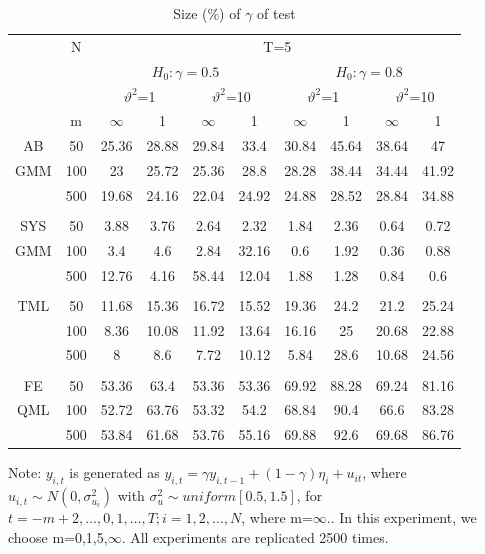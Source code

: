 \documentclass[12pt,a4paper,hyperref]{article}
\begin{document}
\begin{center}
\begin{table}[H]
\caption{Size (\%) of $\gamma$ of test} \label{table11}
\centering
\begin{tabular} {*{10}{c}}
\toprule
&N& \multicolumn{8}{c}{T=5}\\
\cmidrule(lr){3-10}
&& \multicolumn{4}{c}{$H_{0}: \gamma=0.5$} & \multicolumn{4}{c}{$H_{0}: \gamma=0.8$}\\
  \cmidrule(lr){3-6} \cmidrule(lr){7-10}
&&  \multicolumn{2}{c}{$\vartheta^{2}$=1}&\multicolumn{2}{c}{$\vartheta^{2}$=10} & \multicolumn{2}{c}{$\vartheta^{2}$=1}&\multicolumn{2}{c}{$\vartheta^{2}$=10}\\
\cmidrule(lr){3-4} \cmidrule(lr){5-6}\cmidrule(lr){7-8}\cmidrule(lr){9-10}
& m & $\infty$ &1&$\infty$ &1&$\infty$ &1&$\infty$&1\\
\cmidrule(lr){3-4} \cmidrule(lr){5-6}\cmidrule(lr){7-8}\cmidrule(lr){9-10}
AB&50 &25.36&	28.88&	29.84&	33.4	&30.84	&45.64&	38.64	&47 \\
GMM&100&23	&25.72	&25.36	&28.8	&28.28	&38.44&	34.44&	41.92\\ 
 &500& 19.68&	24.16	&22.04	&24.92&	24.88&	28.52	&28.84&	34.88\\
\midrule \\
\cmidrule(lr){3-4} \cmidrule(lr){5-6}\cmidrule(lr){7-8}\cmidrule(lr){9-10}
SYS&50 &3.88	&3.76&	2.64&	2.32	&1.84&	2.36&	0.64&	0.72\\
 GMM&100& 3.4	&4.6&	2.84	&32.16	&0.6&	1.92	&0.36&	0.88\\  
 &500 &12.76	&4.16	&58.44	&12.04&	1.88&	1.28&	0.84&	0.6\\

\midrule \\
\cmidrule(lr){3-4} \cmidrule(lr){5-6}\cmidrule(lr){7-8}\cmidrule(lr){9-10}
TML &50 	&11.68&	15.36	&16.72&15.52&	19.36	&24.2&	21.2	&25.24 \\
&100&8.36	&10.08&	11.92&	13.64	&16.16&	25	&20.68&	22.88\\
 &500 & 8&	8.6	&7.72&	10.12&	5.84&	28.6&	10.68	&24.56  \\
 \midrule \\
\cmidrule(lr){3-4} \cmidrule(lr){5-6}\cmidrule(lr){7-8}\cmidrule(lr){9-10}
FE& 50 &53.36&	63.4&53.36&	53.36&69.92&88.28&	69.24&81.16
\\
 QML&100 &52.72	&63.76&53.32&54.2&68.84	&90.4&	66.6	&83.28
 \\ 
 &500 &53.84&61.68&53.76&55.16&69.88&92.6&	69.68&	86.76
 \\  
\bottomrule
\end{tabular}
\begin{tablenotes}
      \small
      \item Note: $y_{i,t}$ is generated as $y_{i,t}=\gamma y_{i,t-1}+(1-\gamma)\eta_{i}+u_{it}$, where $u_{i,t} \sim N\left(0, \sigma^{2}_{u_{i}} \right)$ with $\sigma^{2}_{u} \sim uniform\left[0.5,1.5 \right]$, for $t=-m+2,\ldots , 0, 1,\ldots, T; i=1,2,\ldots ,N$, where m=$\infty$.. In this experiment, we choose m=0,1,5,$\infty$.  All experiments are replicated 2500 times.
              \end{tablenotes}
\end{table}
\end{center}
\end{document}
